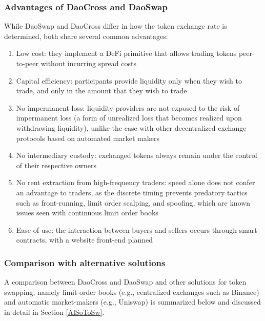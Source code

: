 \documentclass[11pt, reqno]{amsart}
\theoremstyle{definition}
\theoremstyle{remark}
\begin{document}
\subsubsection{Advantages of DaoCross and DaoSwap}
While DaoSwap and DaoCross differ in how the token exchange rate is determined,
both share several common advantages:
\begin{enumerate}
	\item Low cost:
	      they implement a DeFi primitive that allows trading tokens
          peer-to-peer without incurring spread costs
	\item Capital efficiency:
	      participants provide liquidity only when
	      they wish to trade, and only in the amount that they wish to trade
	\item No impermanent loss:
	      liquidity providers are not exposed to the risk of impermanent loss
	      (a form of unrealized loss that becomes realized upon withdrawing
	      liquidity), unlike the case with other decentralized exchange protocols
	      based on automated market makers
	\item No intermediary custody:
	      exchanged tokens always remain under the control of their respective
	      owners
	\item No rent extraction from high-frequency traders:
	      speed alone does not confer an advantage to traders, as the discrete
	      timing prevents predatory tactics such as front-running, limit order
	      scalping, and spoofing, which are known issues seen with continuous
	      limit order books
	\item Ease-of-use: the interaction between buyers and sellers occurs
	      through smart contracts, with a website front-end planned
\end{enumerate}

\subsubsection{Comparison with alternative solutions}
A comparison between DaoCross and DaoSwap and other solutions for token
swapping, namely limit-order books (e.g., centralized exchanges such as
Binance) and automatic market-makers (e.g., Uniswap) is summarized below
and discussed in detail in Section \ref{AlSoToSw}.
\end{document}

